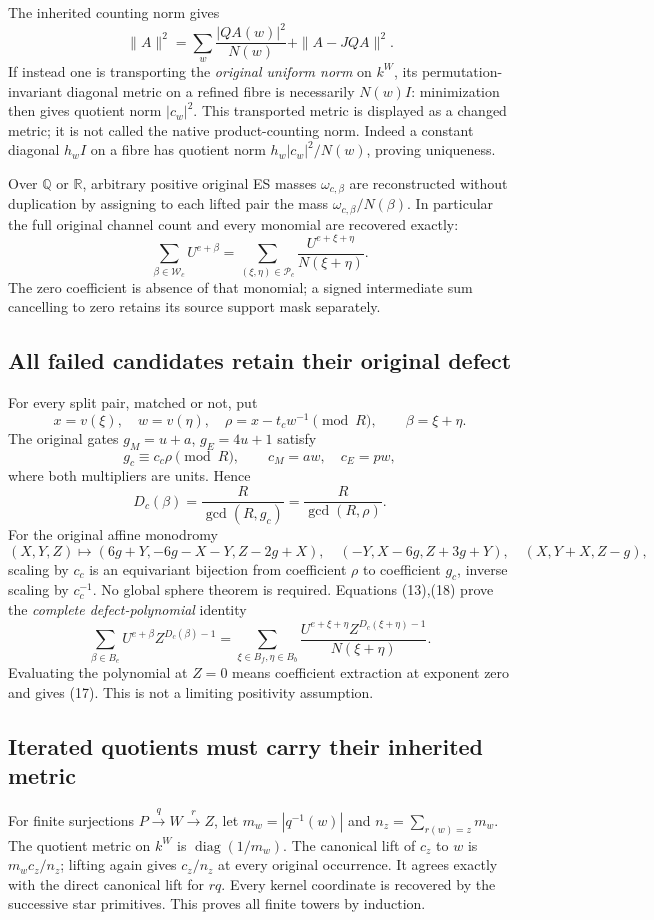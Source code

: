 The inherited counting norm gives
\[
 \|A\|^2=\sum_w\frac{|QA(w)|^2}{N(w)}+\|A-JQA\|^2.             \tag{16}
\]
If instead one is transporting the \emph{original uniform norm} on
$k^W$, its permutation-invariant diagonal metric on a refined fibre is
necessarily $N(w)I$: minimization then gives quotient norm $|c_w|^2$.
This transported metric is displayed as a changed metric; it is not called
the native product-counting norm. Indeed a constant diagonal $h_wI$ on a
fibre has quotient norm $h_w|c_w|^2/N(w)$, proving uniqueness.

Over $\mathbb Q$ or $\mathbb R$, arbitrary positive original ES masses $\omega_{c,\beta}$ are
reconstructed without duplication by assigning to each lifted pair the
mass $\omega_{c,\beta}/N(\beta)$. In particular the full original
channel count and every monomial are recovered exactly:
\[
 \boxed{\sum_{\beta\in\mathscr W_c}U^{e+\beta}
 =\sum_{(\xi,\eta)\in\mathscr P_c}
          \frac{U^{e+\xi+\eta}}{N(\xi+\eta)}.}      \tag{17}
\]
The zero coefficient is absence of that monomial; a signed intermediate
sum cancelling to zero retains its source support mask separately.

\subsection{All failed candidates retain their original defect}
For every split pair, matched or not, put
\[
 x=v(\xi),\quad w=v(\eta),\quad\rho=x-t_cw^{-1}\pmod R,
 \qquad \beta=\xi+\eta.
\]
The original gates $g_M=u+a$, $g_E=4u+1$ satisfy
\[
 g_c\equiv c_c\rho\pmod R,
 \qquad c_M=aw,\quad c_E=pw,                        \tag{18}
\]
where both multipliers are units. Hence
\[
 D_c(\beta)=\frac R{\gcd(R,g_c)}=\frac R{\gcd(R,\rho)}.         \tag{19}
\]
For the original affine monodromy
\[
 (X,Y,Z)\mapsto(6g+Y,-6g-X-Y,Z-2g+X),\quad
 (-Y,X-6g,Z+3g+Y),\quad(X,Y+X,Z-g),
\]
scaling by $c_c$ is an equivariant bijection from coefficient $\rho$ to
coefficient $g_c$, inverse scaling by $c_c^{-1}$. No global sphere theorem
is required. Equations (13),(18) prove the \emph{complete defect-polynomial}
identity
\[
 \sum_{\beta\in B_e}U^{e+\beta}Z^{D_c(\beta)-1}
 =\sum_{\xi\in B_f,\eta\in B_b}
       \frac{U^{e+\xi+\eta}Z^{D_c(\xi+\eta)-1}}{N(\xi+\eta)}. \tag{20}
\]
Evaluating the polynomial at $Z=0$ means coefficient extraction at exponent
zero and gives (17). This is not a limiting positivity assumption.

\subsection{Iterated quotients must carry their inherited metric}
For finite surjections $P\xrightarrow q W\xrightarrow r Z$, let
$m_w=|q^{-1}(w)|$ and $n_z=\sum_{r(w)=z}m_w$.
The quotient metric on $k^W$ is $\operatorname{diag}(1/m_w)$.
The canonical lift of $c_z$ to $w$ is $m_wc_z/n_z$; lifting again gives
$c_z/n_z$ at every original occurrence. It agrees exactly with the direct
canonical lift for $rq$. Every kernel coordinate is recovered by the
successive star primitives. This proves all finite towers by induction.


